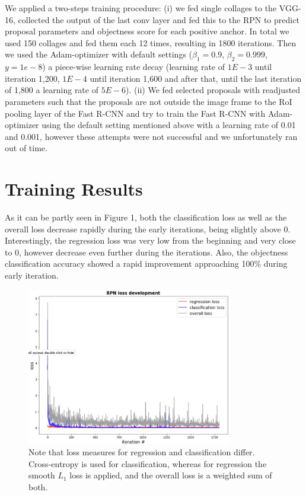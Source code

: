 \documentclass[a4paper]{article}
\begin{document}
We applied a two-steps training procedure: (i) we fed single collages to the VGG-16, collected the output of the last conv layer and fed this to the RPN to predict proposal parameters and objectness score for each positive anchor. In total we used 150 collages and fed them each 12 times, resulting in 1800 iterations. Then we used the Adam-optimizer with default settings ($\beta_1 = 0.9$, $\beta_2 = 0.999$, $y = 1e-8$) a piece-wise learning rate decay (learning rate of $1E-3$ until iteration 1,200, $1E-4$ until iteration 1,600 and after that, until the last iteration of 1,800 a learning rate of $5E-6$). (ii) We fed selected proposals with readjusted parameters such that the proposals are not outside the image frame to the RoI pooling layer of the Fast R-CNN and try to train the Fast R-CNN with Adam-optimizer using the default setting mentioned above with a learning rate of 0.01 and 0.001, however these attempts were not successful and we unfortunately ran out of time.

\section{Training Results}

As it can be partly seen in Figure 1, both the classification loss as well as the overall loss decrease rapidly during the early iterations, being slightly above 0. Interestingly, the regression loss was very low from the beginning and very close to 0, however decrease even further during the iterations.
Also, the objectness classification accuracy showed a rapid improvement approaching 100\% during early iteration.

\begin{figure}
\centering
\includegraphics[width=0.8\textwidth]{rpn_loss_development.jpg}
\caption{\label{fig:rpn_loss_development}Note that loss measures for regression and classification differ. Cross-entropy is used for classification, whereas for regression the smooth $L_1$ loss is applied, and the overall loss is a weighted sum of both.}
\end{figure}
\end{document}
